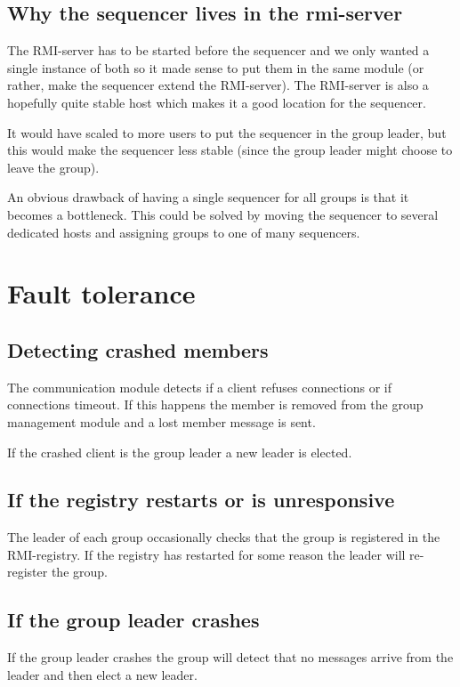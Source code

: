 \documentclass[english]{article}
\begin{document}
\subsection{Why the sequencer lives in the rmi-server}
The RMI-server has to be started before the sequencer and we only wanted a single instance of both so it made sense to put them in the same module (or rather, make the sequencer extend the RMI-server). The RMI-server is also a hopefully quite stable host which makes it a good location for the sequencer.

It would have scaled to more users to put the sequencer in the group leader, but this would make the sequencer less stable (since the group leader might choose to leave the group).

An obvious drawback of having a single sequencer for all groups is that it becomes a bottleneck. This could be solved by moving the sequencer to several dedicated hosts and assigning groups to one of many sequencers.

\section{Fault tolerance}
\subsection{Detecting crashed members}
The communication module detects if a client refuses connections or if connections timeout. If this happens the member is removed from the group management module and a lost member message is sent.

If the crashed client is the group leader a new leader is elected.

\subsection{If the registry restarts or is unresponsive}
The leader of each group occasionally checks that the group is registered in the RMI-registry. If the registry has restarted for some reason the leader will re-register the group.

\subsection{If the group leader crashes}
If the group leader crashes the group will detect that no messages arrive from the leader and then elect a new leader. 
\end{document}
